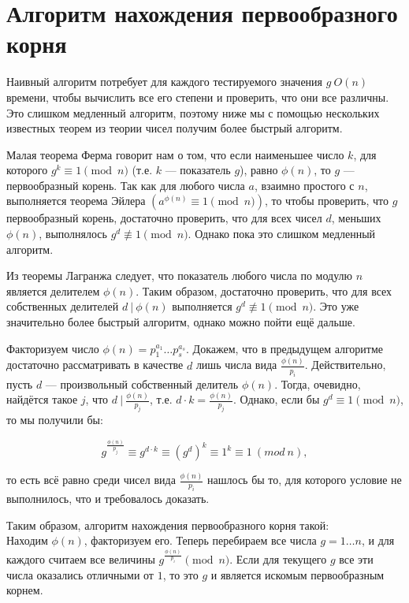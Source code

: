 \documentclass[12pt,a4paper]{scrartcl}
\begin{document}
	
\section{Алгоритм нахождения первообразного корня}

Наивный алгоритм потребует для каждого тестируемого значения $g\ O(n)$ времени, чтобы вычислить все его степени и проверить, что они все различны. Это слишком медленный алгоритм, поэтому ниже мы с помощью нескольких известных теорем из теории чисел получим более быстрый алгоритм.

Малая теорема Ферма говорит нам о том, что если наименьшее число $k$, для которого $g^k \equiv 1 \pmod{n}$ (т.е. $k$ — показатель $g$), равно $\phi(n)$, то $g$ — первообразный корень. Так как для любого числа $a$, взаимно простого с $n$, выполняется теорема Эйлера $(a^{\phi(n)} \equiv 1 \pmod{n})$, то чтобы проверить, что $g$ первообразный корень, достаточно проверить, что для всех чисел $d$, меньших $\phi(n)$, выполнялось $g^d \not\equiv 1 \pmod{n}$. Однако пока это слишком медленный алгоритм.

Из теоремы Лагранжа следует, что показатель любого числа по модулю $n$ является делителем $\phi(n)$. Таким образом, достаточно проверить, что для всех собственных делителей $d\ |\ \phi(n)$ выполняется $g^d \not\equiv 1 \pmod{n}$. Это уже значительно более быстрый алгоритм, однако можно пойти ещё дальше.

Факторизуем число $\phi(n) = p_1^{a_1} \ldots p_s^{a_s}$. Докажем, что в предыдущем алгоритме достаточно рассматривать в качестве $d$ лишь числа вида $\frac{ \phi(n) }{ p_i }$. Действительно, пусть $d$ — произвольный собственный делитель $\phi(n)$. Тогда, очевидно, найдётся такое $j$, что $d\ |\ \frac{ \phi(n) }{ p_j }$, т.е. $d \cdot k = \frac{ \phi(n) }{ p_j }$. Однако, если бы $g^d \equiv 1 \pmod{n}$, то мы получили бы:

$$g^{\frac{ \phi(n) }{ p_j }} \equiv g^{d \cdot k} \equiv (g^d)^k \equiv 1^k \equiv 1\ (mod\ n),$$

то есть всё равно среди чисел вида $\frac{ \phi(n) }{ p_i }$ нашлось бы то, для которого условие не выполнилось, что и требовалось доказать.

Таким образом, алгоритм нахождения первообразного корня такой:\\

Находим $\phi(n)$, факторизуем его. Теперь перебираем все числа $g = 1 \ldots n$, и для каждого считаем все величины $g^{ \frac{ \phi(n) }{ p_i } } \pmod{n}$. Если для текущего $g$ все эти числа оказались отличными от $1$, то это $g$ и является искомым первообразным корнем.\\
\end{document}
